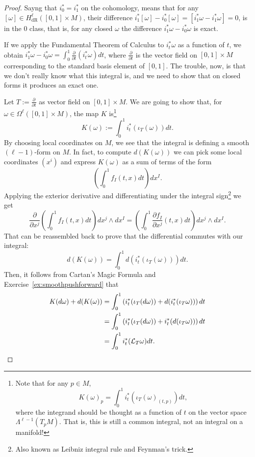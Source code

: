 \begin{proof}
  Sayng that  $i_0^* = i_1^*$ on the cohomology, means that for any $[\omega]\in H_{\mathrm{dR}}^\ell([0,1]\times M)$, their difference $i_1^*[\omega] - i_0^*[\omega] = [i_1^*\omega - i_1^*\omega] = 0$, is in the $0$ class, that is, for any closed $\omega$ the difference $i_1^*\omega - i_0^*\omega$ is exact.

  If we apply the Fundamental Theorem of Calculus to $i^*_t\omega$ as a function of $t$, we obtain $i_1^*\omega - i_0^*\omega = \int_0^1 \frac{\partial}{\partial t} (i^*_t \omega) dt$,
  where $\frac{\partial}{\partial t}$ is the vector field on $[0,1]\times M$ corresponding to the standard basis element of $[0,1]$.
  The trouble, now, is that we don't really know what this integral is, and we need to show that on closed forms it produces an exact one.

  Let $T:=\frac{\partial}{\partial t}$ as vector field on $[0,1]\times M$.
  We are going to show that, for $\omega\in\Omega^\ell([0,1]\times M)$, the map $K$ is\footnote{Note that for any $p\in M$,
    \begin{equation}
      K(\omega)_p = \int_0^1 i_t^*(\iota_T(\omega)_{(t,p)})dt,
    \end{equation}
    where the integrand should be thought as a function of $t$ on the vector space $\Lambda^{\ell-1}(T_pM)$.
    That is, this is still a common integral, not an integral on a manifold!}
  \begin{equation}
    K(\omega) := \int_0^1 i^*_t(\iota_T(\omega)) dt.
  \end{equation}
  By choosing local coordinates on $M$, we see that the integral is defining a smooth $(\ell-1)$-form on $M$.
  In fact, to compute $d(K(\omega))$ we can pick some local coordinates $(x^i)$ and express $K(\omega)$ as a sum of terms of the form
  \begin{equation}
    \left(\int_0^1 f_I(t,x) dt\right)dx^I.
  \end{equation}
  Applying the exterior derivative and differentiating under the integral sign\footnote{Also known as Leibniz integral rule and Feynman's trick.} we get
  \begin{equation}
    \frac{\partial}{\partial x^j}\left(\int_0^1 f_I(t,x) dt\right)dx^j\wedge dx^I = \left(\int_0^1 \frac{\partial f_I}{\partial x^j}(t,x) dt\right)dx^j\wedge dx^I.
  \end{equation}
  That can be reassembled back to prove that the differential commutes with our integral:
  \begin{equation}
    d(K(\omega)) = \int_0^1 d(i_t^*(\iota_T(\omega)))dt.
  \end{equation}
  Then, it follows from Cartan's Magic Formula and Exercise~\ref{ex:smoothpushforward} that
  \begin{align}
    K(d\omega) + d(K(\omega))
     & = \int_0^1\left( i_t^*(\iota_T(d\omega)) + d (i_t^*(\iota_T\omega)) \right) dt \\
     & = \int_0^1\left( i_t^*(\iota_T(d\omega)) + i_t^* (d(\iota_T\omega)) \right) dt \\
     & = \int_0^1 i_t^*(\mathcal{L}_T\omega) dt.
  \end{align}


\end{proof}
